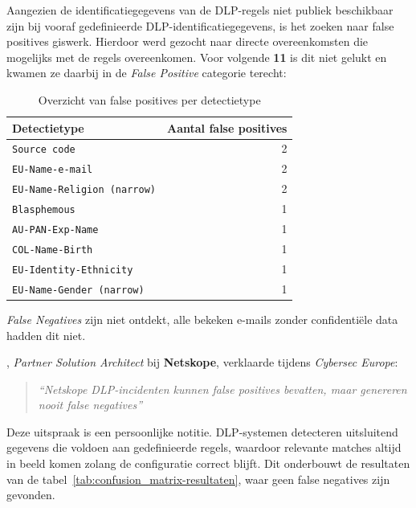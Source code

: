 Aangezien de identificatiegegevens van de DLP-regels niet publiek beschikbaar zijn bij vooraf gedefinieerde DLP-identificatiegegevens,
is het zoeken naar false positives giswerk. Hierdoor werd gezocht naar directe overeenkomsten die mogelijks met de regels overeenkomen.
Voor volgende \textbf{11} is dit niet gelukt en kwamen ze daarbij in de \textit{False Positive} categorie terecht:

\begin{table}[H]
  \centering
  \begin{tabular}{lr}
    \toprule
    \textbf{Detectietype} & \textbf{Aantal false positives} \\
    \midrule
    \texttt{Source code}                & 2 \\
    \texttt{EU-Name-e-mail}             & 2 \\
    \texttt{EU-Name-Religion (narrow)} & 2 \\
    \texttt{Blasphemous}               & 1 \\
    \texttt{AU-PAN-Exp-Name}           & 1 \\
    \texttt{COL-Name-Birth}            & 1 \\
    \texttt{EU-Identity-Ethnicity}     & 1 \\
    \texttt{EU-Name-Gender (narrow)}   & 1 \\
    \bottomrule
  \end{tabular}
  \caption{Overzicht van false positives per detectietype}
  \label{tab:false-positives}
\end{table}


\textit{False Negatives} zijn niet ontdekt, alle bekeken e-mails zonder confidentiële data hadden dit niet.

\textcite{Quaeyhaegens2025}, \textit{Partner Solution Architect} bij \textbf{Netskope}, verklaarde tijdens \textit{Cybersec Europe}:

\begin{quote}
\textit{``Netskope DLP-incidenten kunnen false positives bevatten, maar genereren nooit false negatives''}
\end{quote}

Deze uitspraak is een persoonlijke notitie. 
DLP-systemen detecteren uitsluitend gegevens die voldoen aan gedefinieerde regels, waardoor relevante matches altijd in beeld komen zolang de configuratie correct blijft.
Dit onderbouwt de resultaten van de tabel~\ref{tab:confusion_matrix-resultaten}, waar geen false negatives zijn gevonden.


